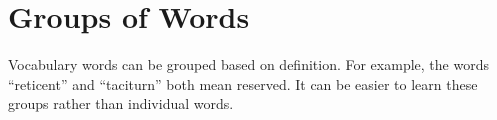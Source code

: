 \section{Groups of Words}
Vocabulary words can be grouped based on definition. For example, the words ``reticent'' and ``taciturn'' both mean reserved. It can be easier to learn these groups rather than individual words.